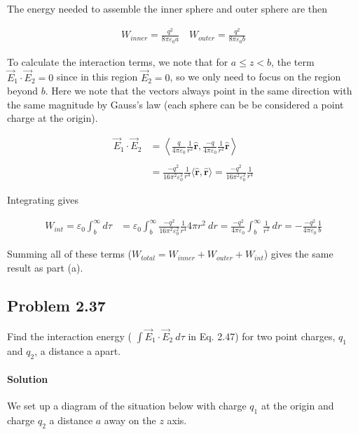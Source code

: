 \documentclass{article}
\newcommand{\bvec}[1]{\mathbf{\hat{#1}}}
\begin{document}
The energy needed to assemble the inner sphere and outer sphere are then 

\begin{align*}
    W_{inner} = \frac{q^2}{8\pi\varepsilon_0a} \quad W_{outer} = \frac{q^2}{8\pi\varepsilon_0b}
\end{align*}

To calculate the interaction terms, we note that for $a \leq z < b$, the term $\vec{E}_1 \cdot \vec{E}_2 = 0$ since in this region $\vec{E}_2 = 0$, so we only need to focus on the region beyond $b$. Here we note that the vectors always point in the same direction with the same magnitude by Gauss's law (each sphere can be be considered a point charge at the origin).

\begin{align*}
    \vec{E}_1 \cdot \vec{E}_2 &= \left\langle \frac{q}{4\pi\varepsilon_0}\frac{1}{r^2}\bvec{r},  \frac{-q}{4\pi\varepsilon_0}\frac{1}{r^2}\bvec{r}\right\rangle \\
    \\
    &= \frac{-q^2}{16\pi^2 \varepsilon_0^2}\frac{1}{r^4}\langle \bvec{r}, \bvec{r}\rangle = \frac{-q^2}{16\pi^2 \varepsilon_0^2}\frac{1}{r^4}
\end{align*}

Integrating gives 

\begin{align*}
   W_{int} = \varepsilon_0 \int_b^{\infty} d\tau &= \varepsilon_0 \int_b^{\infty} \frac{-q^2}{16\pi^2 \varepsilon_0^2}\frac{1}{r^4}4\pi r^2\ dr  = \frac{-q^2}{4\pi \varepsilon_0} \int_b^{\infty} \frac{1}{r^2}\ dr = -\frac{-q^2}{4\pi \varepsilon_0}\frac{1}{b}
\end{align*}

Summing all of these terms ($W_{total} = W_{inner} + W_{outer} + W_{int}$) gives the same result as part (a).

\newpage

\subsection*{Problem 2.37}
Find the interaction energy ( $\int \vec{E}_1 \cdot \vec{E}_2\ d\tau$ in Eq. 2.47) for two point charges, $q_1$ and $q_2$, a distance a apart. 

\paragraph{Solution} We set up a diagram of the situation below with charge $q_1$ at the origin and charge $q_2$ a distance $a$ away on the $z$ axis. 
\end{document}
